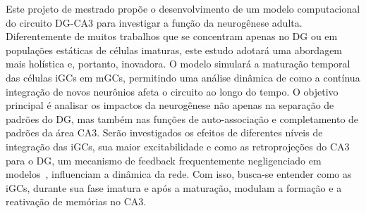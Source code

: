 Este projeto de mestrado propõe o desenvolvimento de um modelo computacional do circuito DG-CA3 para investigar a função da
neurogênese adulta. Diferentemente de muitos trabalhos que se concentram apenas no DG ou em populações estáticas de células
imaturas, este estudo adotará uma abordagem mais holística e, portanto, inovadora. O modelo simulará a maturação temporal das
células iGCs em mGCs, permitindo uma análise dinâmica de como a contínua integração de novos neurônios afeta o circuito ao longo
do tempo. O objetivo principal é analisar os impactos da neurogênese não apenas na separação de padrões do DG, mas também nas
funções de auto-associação e completamento de padrões da área CA3. Serão investigados os efeitos de diferentes níveis de
integração das iGCs, sua maior excitabilidade e como as retroprojeções do CA3 para o DG, um mecanismo de feedback frequentemente
negligenciado em modelos~\cite{myersPattern2011}, influenciam a dinâmica da rede. Com isso, busca-se entender como as iGCs,
durante sua fase imatura e após a maturação, modulam a formação e a reativação de memórias no CA3.
